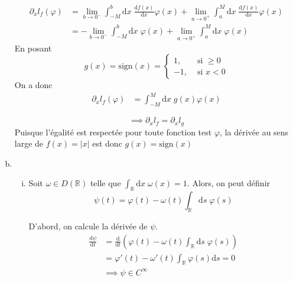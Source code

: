 \documentclass[letterpaper,12pt,oneside,final]{book}
\begin{document}
\begin{enumerate}[a)]
\begin{equation*}
\begin{split}
	 \partial_{x}l_{f}(\varphi) & = \lim_{b \to 0^{-}}  \int_{-M}^{b}\text{d}x\;\frac{\text{d}f(x)}{\text{d}x} \varphi(x) + \lim_{a \to 0^{+}} \int_{a}^{M}\text{d}x\; \frac{\text{d}f(x)}{\text{d}x} \varphi(x)\\
& = -\lim_{b \to 0^{-}} \int_{-M}^{b}\text{d}x\;\varphi (x) + \lim_{a \to 0^{+}} \int_{a}^{M}\text{d}x\;\varphi (x)
\end{split}
\end{equation*}
En posant
\[ g(x) = \text{sign}(x) = \begin{cases}
	1, & \text{ si } \geq 0\\ 
	-1, & \text{ si } x < 0
\end{cases} \]
On a donc
\begin{equation*}
\begin{split}
	\partial_{x}l_{f}(\varphi) & = \int_{-M}^{M}\text{d}x\;g(x)\varphi(x) 
\end{split}
\end{equation*}

\[ \implies \partial_{x}l_{f} = \partial_{x}l_{g} \]
Puisque l'égalité est respectée pour toute fonction test \( \varphi \), la dérivée au sens large de \(  f(x) = \lvert x \rvert  \) est donc \( g(x) = \text{sign}(x)\)

\item %

	\begin{enumerate}[(i)]
		
	
	\item %
Soit \( \omega \in D(\mathbb{R} )  \) telle que \( \int_{\mathbb{R} }\text{d}x\;\omega(x) = 1\). Alors, on peut définir 
\[ \psi(t) = \varphi(t) - \omega(t) \int_{\mathbb{R} }\text{d}s\;\varphi(s) \]

D'abord, on calcule la dérivée de \( \psi \). 
\begin{equation*}
\begin{split}
	\frac{\text{d}\psi}{\text{d}t} & = \frac{\text{d}}{\text{d}t} \left(\varphi(t) - \omega(t) \int_{\mathbb{R} }\text{d}s\;\varphi(s)\right) \\ 
& = \varphi '(t) - \omega'(t)\int_{\mathbb{R} } \varphi(s)\text{d}s = 0\\ 
& \implies \psi \in C^{\infty }
\end{split}
\end{equation*}


\end{enumerate}
\end{enumerate}
\end{document}
